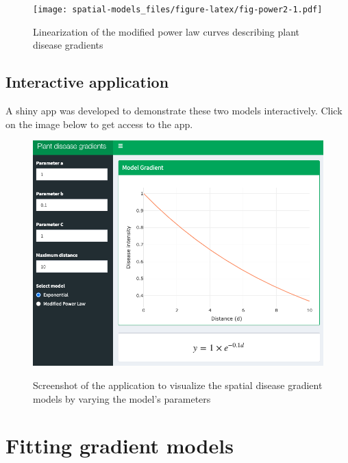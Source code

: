 \documentclass[
  letterpaper,
]{book}
\begin{document}
\begin{figure}

\texttt{[image: spatial-models\_files/figure-latex/fig-power2-1.pdf]} \hfill{}

\caption{\label{fig-power2}Linearization of the modified power law
curves describing plant disease gradients}

\end{figure}

\hypertarget{interactive-application-1}{%
\section{Interactive application}\label{interactive-application-1}}

A shiny app was developed to demonstrate these two models interactively.
Click on the image below to get access to the app.

\begin{figure}

{\centering 

\href{https://delponte.shinyapps.io/gradients}{\includegraphics[width=5.55208in,height=\textheight]{imgs/shiny_gradients.png}}

}

\caption{\label{fig-models}Screenshot of the application to visualize
the spatial disease gradient models by varying the model's parameters}

\end{figure}

\hypertarget{fitting-gradient-models}{%
\chapter{Fitting gradient models}\label{fitting-gradient-models}}
\end{document}
